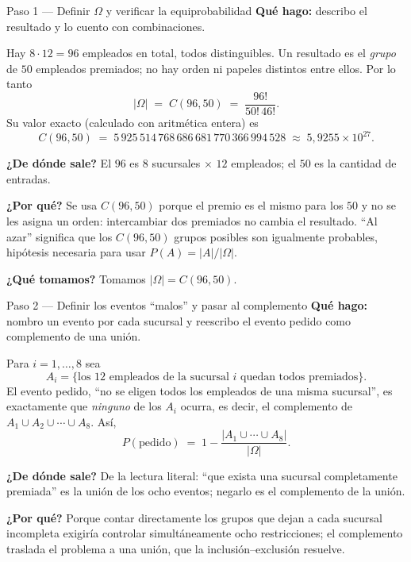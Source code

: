 \documentclass[11pt]{article}
\begin{document}
\begin{sol}

\begin{paso}{Paso 1 --- Definir $\Omega$ y verificar la equiprobabilidad}
\textbf{Qu\'e hago:} describo el resultado y lo cuento con combinaciones.

Hay $8\cdot 12 = 96$ empleados en total, todos distinguibles. Un resultado es el \emph{grupo} de $50$ empleados premiados; no hay orden ni papeles distintos entre ellos. Por lo tanto
\[
|\Omega| \;=\; C(96,50) \;=\; \frac{96!}{50!\,46!} .
\]
Su valor exacto (calculado con aritm\'etica entera) es
\[
C(96,50) \;=\; 5\,925\,514\,768\,686\,681\,770\,366\,994\,528 \;\approx\; 5{,}9255\times 10^{27}.
\]

\textbf{¿De d\'onde sale?} El $96$ es $8$ sucursales $\times$ $12$ empleados; el $50$ es la cantidad de entradas.

\textbf{¿Por qu\'e?} Se usa $C(96,50)$ porque el premio es el mismo para los $50$ y no se les asigna un orden: intercambiar dos premiados no cambia el resultado. ``Al azar'' significa que los $C(96,50)$ grupos posibles son igualmente probables, hip\'otesis necesaria para usar $P(A)=|A|/|\Omega|$.

\textbf{¿Qu\'e tomamos?} Tomamos $|\Omega|=C(96,50)$.
\end{paso}

\begin{paso}{Paso 2 --- Definir los eventos ``malos'' y pasar al complemento}
\textbf{Qu\'e hago:} nombro un evento por cada sucursal y reescribo el evento pedido como complemento de una uni\'on.

Para $i=1,\dots,8$ sea
\[
A_i=\{\text{los 12 empleados de la sucursal } i \text{ quedan todos premiados}\}.
\]
El evento pedido, ``no se eligen todos los empleados de una misma sucursal'', es exactamente que \emph{ninguno} de los $A_i$ ocurra, es decir, el complemento de $A_1\cup A_2\cup\cdots\cup A_8$. As\'i,
\[
P(\text{pedido}) \;=\; 1-\frac{|A_1\cup\cdots\cup A_8|}{|\Omega|}.
\]

\textbf{¿De d\'onde sale?} De la lectura literal: ``que exista una sucursal completamente premiada'' es la uni\'on de los ocho eventos; negarlo es el complemento de la uni\'on.

\textbf{¿Por qu\'e?} Porque contar directamente los grupos que dejan a cada sucursal incompleta exigir\'ia controlar simult\'aneamente ocho restricciones; el complemento traslada el problema a una uni\'on, que la inclusi\'on--exclusi\'on resuelve.


\end{paso}
\end{sol}
\end{document}
